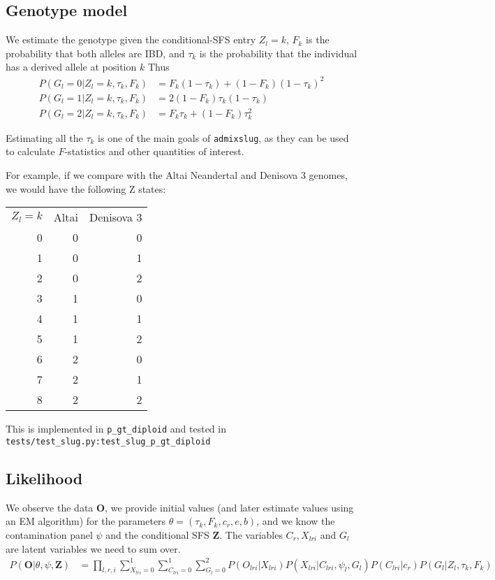 \documentclass[10pt,a4paper]{article}
\begin{document}
\subsection*{Genotype model}
We estimate the genotype given the conditional-SFS entry $Z_l=k$, $F_k$ is the probability that both alleles are IBD, and $\tau_k$ is the probability that the individual has a derived allele at position $k$
Thus
\begin{align}
P(G_l = 0| Z_l=k, \tau_k, F_k) &= F_k (1-\tau_k) + (1-F_k) (1-\tau_k)^2\nonumber\\
P(G_l = 1| Z_l=k, \tau_k, F_k) &= 2(1-F_k) \tau_k(1-\tau_k)\nonumber\\
P(G_l = 2| Z_l=k, \tau_k, F_k) &= F_k \tau_k + (1-F_k) \tau_k^2\label{eq:prg}
\end{align}

Estimating all the $\tau_k$ is one of the main goals of \texttt{admixslug}, as they can be used to calculate $F$-statistics and other quantities of interest.

For example, if we compare with the Altai Neandertal and Denisova 3 genomes, we would have the following Z states:
\begin{table}[!ht]
	\begin{center}
		
		\begin{tabular}{r r r }
			$Z_l=k$ & Altai & Denisova 3 \\
			0 & 0 & 0 \\
			1 & 0 & 1 \\
			2 & 0 & 2 \\
			3 & 1 & 0 \\
			4 & 1 & 1 \\
			5 & 1 & 2 \\
			6 & 2 & 0 \\
			7 & 2 & 1 \\
			8 & 2 & 2 \\
		\end{tabular}
	\end{center}
\end{table}

This is implemented in \texttt{p\_gt\_diploid} and tested in \texttt{tests/test\_slug.py:test\_slug\_p\_gt\_diploid}


\subsection*{Likelihood}
We observe the data $\mathbf{O}$, we provide initial values (and later estimate values using an EM algorithm) for the parameters $\theta = (\tau_k, F_k, c_r, e,b)$, and we know the 
contamination panel $\psi$ and the conditional SFS $\mathbf{Z}$. The variables
$C_r, X_{lri}$ and $G_l$ are latent variables we need to sum over.
\begin{align}
P(\mathbf{O} | \theta, \psi, \mathbf{Z}) &= 
\prod_{l, r, i}\sum_{X_{lri}=0}^1\sum_{C_{lri}=0}^1\sum_{G_{l}=0}^2 P(O_{lri} |X_{lri}) P(X_{lri} | C_{lri}, \psi_l, G_l) P(C_{lri} | c_r) P(G_l | Z_l, \tau_k, F_k)
\end{align}
\end{document}
